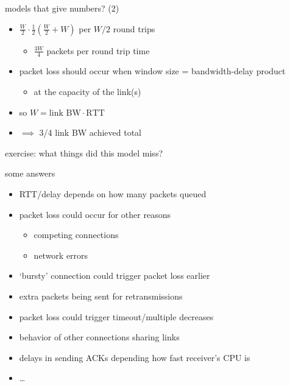 \begin{frame}{models that give numbers? (2)}
    \begin{itemize}
    \item $\frac{W}{2}\cdot \frac{1}{2}\left(\frac{W}{2} + W\right)$ per $W/2$ round trips
        \begin{itemize}
        \item $\frac{3W}{4}$ packets per round trip time
        \end{itemize}
    \item packet loss should occur when window size = bandwidth-delay product
        \begin{itemize}
        \item at the capacity of the link(s)
        \end{itemize}
    \item so $W=\text{link BW} \cdot \text{RTT}$
    \item $\implies$ 3/4 link BW achieved total
    \end{itemize}
\end{frame}


\begin{frame}{exercise: what things did this model miss?}
\end{frame}

\begin{frame}{some answers}
    \begin{itemize}
    \item RTT/delay depends on how many packets queued
    \item packet loss could occur for other reasons
        \begin{itemize}
        \item competing connections
        \item network errors
        \end{itemize}
    \item `bursty' connection could trigger packet loss earlier
    \item extra packets being sent for retransmissions
    \item packet loss could trigger timeout/multiple decreases
    \item behavior of other connections sharing links
    \item delays in sending ACKs depending how fast receiver's CPU is
    \item \ldots
    \end{itemize}
\end{frame}

